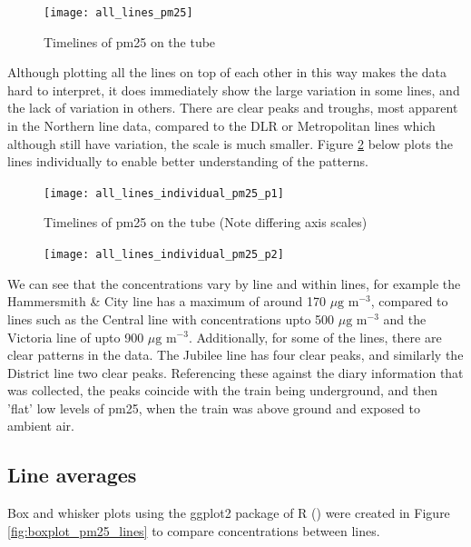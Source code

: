 \begin{figure}[H]
\centering
\texttt{[image: all\_lines\_pm25]}
\caption{Timelines of \gls{pm25} on the tube}
\label{fig:all_lines_pm25}
\end{figure}

Although plotting all the lines on top of each other in this way makes the data hard to interpret, it does immediately show the large variation in some lines, and the lack of variation in others. There are clear peaks and troughs, most apparent in the Northern line data, compared to the DLR or Metropolitan lines which although still have variation, the scale is much smaller. Figure \ref{fig:all_lines_individual_pm25_p1} below plots the lines individually to enable better understanding of the patterns.

\begin{figure}[H]
\centering
\caption{Timelines of \gls{pm25} on the tube (Note differing axis scales)}
\texttt{[image: all\_lines\_individual\_pm25\_p1]}
\label{fig:all_lines_individual_pm25_p1}
\end{figure}

\begin{figure}[H]
\centering
\texttt{[image: all\_lines\_individual\_pm25\_p2]}
\label{fig:all_lines_individual_pm25_p2}
\end{figure}

We can see that the concentrations vary by line and within lines, for example the Hammersmith \& City line has a maximum of around 170 $\mu \text{g m}^{-3}$, compared to lines such as the Central line with concentrations upto 500 $\mu \text{g m}^{-3}$ and the Victoria line of upto 900 $\mu \text{g m}^{-3}$. Additionally, for some of the lines, there are clear patterns in the data. The Jubilee line has four clear peaks, and similarly the District line two clear peaks. Referencing these against the diary information that was collected, the peaks coincide with the train being underground, and then 'flat' low levels of \gls{pm25}, when the train was above ground and exposed to ambient air.

\subsection{Line averages}
\label{subsec:line_averages}

Box and whisker plots using the ggplot2 package of R (\cite{ggplot2}) were created in Figure \ref{fig:boxplot_pm25_lines} to compare concentrations between lines. 

